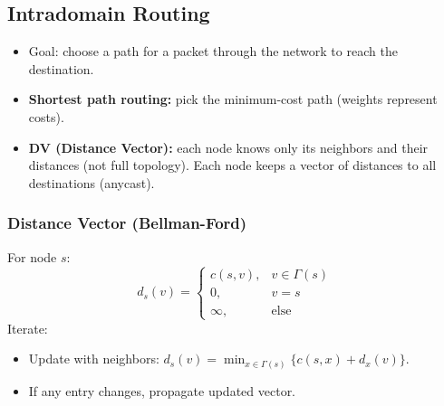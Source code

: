 \subsection{Intradomain Routing}
\begin{itemize}
	\item Goal: choose a path for a packet through the network to reach the destination.
	\item \textbf{Shortest path routing:} pick the minimum-cost path (weights represent costs).
	\item \textbf{DV (Distance Vector):} each node knows only its neighbors and their distances (not full topology). Each node keeps a vector of distances to all destinations (anycast).
\end{itemize}

\subsubsection{Distance Vector (Bellman-Ford)}
For node $s$:
\[ d_s(v)=\begin{cases}
c(s,v), & v\in \Gamma(s)\\
0, & v=s\\
\infty, & \text{else}
\end{cases} \]
Iterate:
\begin{itemize}
	\item Update with neighbors: $d_s(v)=\min_{x\in \Gamma(s)}\{c(s,x)+d_x(v)\}$.
	\item If any entry changes, propagate updated vector.
\end{itemize}

